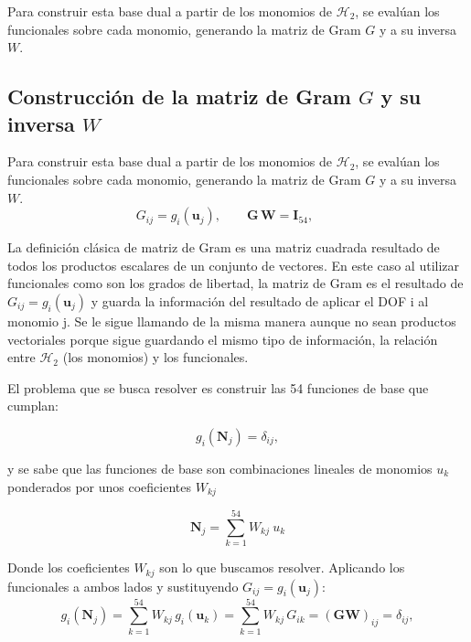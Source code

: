 \documentclass[12pt]{report} %
\begin{document}
Para construir  esta base dual a partir de los monomios de $\mathcal{H}_2$, se evalúan los funcionales sobre cada monomio, generando la matriz de Gram $G$ y a su inversa $W$.

\subsection{Construcción de la matriz de Gram $G$ y su inversa $W$}\label{subsec:construccion-GW}
Para construir  esta base dual a partir de los monomios de $\mathcal{H}_2$, se evalúan los funcionales sobre cada monomio, generando la matriz de Gram $G$ y a su inversa $W$.
\begin{equation}\label{eq:G}
	G_{ij} = g_i(\mathbf{u}_j), \qquad
	\mathbf{G}\,\mathbf{W} = \mathbf{I}_{54}, \qquad
\end{equation}

La definición clásica de matriz de Gram es una matriz cuadrada resultado de todos los productos escalares de un conjunto de vectores. En este caso al utilizar funcionales como son los grados de libertad, la matriz de Gram es el resultado de $G_{ij}=g_i(\mathbf{u}_j)$ y guarda la información del resultado de aplicar el DOF i al monomio j. Se le sigue llamando de la misma manera aunque no sean productos vectoriales porque sigue guardando el mismo tipo de información, la relación entre $\mathcal{H}_2$ (los monomios) y los funcionales.


El problema que se busca resolver es construir las 54 funciones de base que cumplan:

\begin{equation*}
	g_i(\mathbf{N}_j) =  \delta_{ij},
\end{equation*}

y se sabe que las funciones de base son combinaciones lineales de monomios $u_k$ ponderados por unos coeficientes $W_{kj}$

\begin{equation*}
	\mathbf{N}_j= \sum_{k=1}^{54} W_{kj}\ u_k
\end{equation*}

Donde los coeficientes $W_{kj}$ son lo que buscamos resolver. Aplicando los funcionales a ambos lados y sustituyendo $ G_{ij} = g_i(\mathbf{u}_j) $:
\begin{equation*}
	g_i(\mathbf{N}_j) = \sum_{k=1}^{54} W_{kj}\, g_i(\mathbf{u}_k) = \sum_{k=1}^{54} W_{kj}\, G_{ik} = (\mathbf{G}\mathbf{W})_{ij} = \delta_{ij},
\end{equation*}
\end{document}
